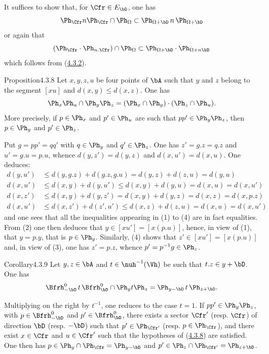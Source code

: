 \documentclass[12pt,a4paper,oneside,english]{smfart}
\makeatletter
\newcommand{\btanchor}[1]{\leavevmode\Hy@raisedlink{\hypertarget{bt:#1}{}}}
\newcommand{\btref}[1]{\hyperlink{bt:#1}{#1}}
\theoremstyle{definition}
\theoremstyle{bt}
\makeatother
\begin{document}
It suffices to show that, for $\Cfr\in E_{\bD}$, one has
\[
\Ph_{\Cfr}n\Ph_{\Cfr}\cap\Ph_{\Omega}
\subset \Ph_{\Omega+\bD}\,n\,\Ph_{\Omega+\bD}
\]
or again that
\[
(\Ph_{\Cfr}\cdot\Ph_{n.\Cfr})\cap\Ph_{\Omega}
\subset \Ph_{\Omega+\bD}\cdot\Ph_{\Omega+n\bD}
\]
which follows from (\btref{4.3.2}).

\begin{state}{Proposition}{4.3.8}\btanchor{4.3.8}
Let $x,y,z,u$ be four points of $\bA$ such that $y$ and $z$ belong to the
segment $[xu]$ and $d(x,y)\leqslant d(x,z)$. One has
\[
\Ph_{x}\Ph_{u}\cap\Ph_{y}\Ph_{z}
= (\Ph_{x}\cap\Ph_{y})\cdot(\Ph_{z}\cap\Ph_{u}).
\]
More precisely, if $p\in\Ph_{x}$ and $p'\in\Ph_{u}$ are such that
$pp'\in\Ph_{y}\Ph_{z}$, then $p\in\Ph_{y}$ and $p'\in\Ph_{z}$.
\end{state}

Put $g = pp' = qq'$ with $q\in\Ph_{y}$ and $q'\in\Ph_{z}$. One has
$z' = g.z = q.z$ and $u' = g.u = p.u$, whence $d(y,z') = d(y,z)$ and
$d(x,u') = d(x,u)$. One deduces:
\begin{align}
d(y,u') &\leqslant d(y, g.z) + d(g.z, g.u) = d(y,z)+d(z,u) = d(y,u)\\
d(x,u') &\leqslant d(x,y)+d(y,u') \leqslant d(x,y)+d(y,u) = d(x,u) = d(x,u')\\
d(x,z') &\leqslant d(x,y)+d(y,z') = d(x,y)+d(y,z) = d(x,z) = d(x, p.z)\\
d(x,u') &\leqslant d(x,z')+d(z',u') \leqslant d(x,z)+d(z,u) = d(x,u) = d(x,u')
\end{align}
and one sees that all the inequalities appearing in (1) to (4) are in fact
equalities. From (2) one then deduces that $y \in [xu'] = [x(p.u)]$, hence,
in view of (1), that $y = p.y$, that is $p\in\Ph_{y}$. Similarly, (4) shows
that $z'\in[xu'] = [x(p.u)]$ and, in view of (3), one has $z' = p.z$, whence
$p' = p^{-1}g \in \Ph_{z}$.

\begin{state}{Corollary}{4.3.9}\btanchor{4.3.9}
Let $y, z\in\bA$ and $t\in\nuh^{-1}(\Vh)$ be such that $t.z \in y+\bD$. One
has
\[
\Bfrh^{0}_{-\bD}\,t\,\Bfrh^{0}_{\bD}\cap\Ph_{y}t\Ph_{z}
= \Ph_{y-\bD}\,t\,\Ph_{z+\bD}.
\]
\end{state}

Multiplying on the right by $t^{-1}$, one reduces to the case $t = 1$. If
$pp'\in\Ph_{y}\Ph_{z}$, with $p\in\Bfrh^{0}_{-\bD}$ and
$p'\in\Bfrh^{0}_{\bD}$, there exists a sector $\Cfr'$ (resp. $\Cfr$) of
direction $\bD$ (resp. $-\bD$) such that $p'\in\Ph_{\Cfr'}$ (resp.
$p\in\Ph_{\Cfr}$), and there exist $x\in\Cfr$ and $u\in\Cfr'$ such that the
hypotheses of (\btref{4.3.8}) are satisfied. One then has
$p \in \Ph_{y}\cap\Ph_{\Cfr} = \Ph_{y-\bD}$ and
$p' \in \Ph_{z}\cap\Ph_{\Cfr'} = \Ph_{z+\bD}$.
\end{document}

